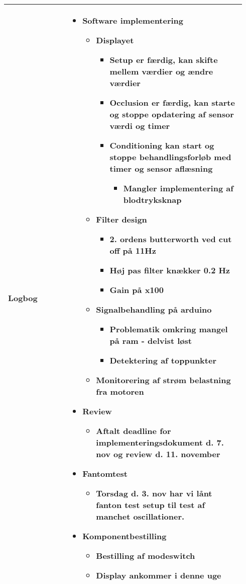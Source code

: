\begin{longtable}{|p{0.24\linewidth}|p{0.7\linewidth}|}
		\\ \hline
		Logbog & 
		\begin{itemize}
			\item Software implementering
			\begin{itemize}
				\item Displayet
				\begin{itemize}
					\item Setup er færdig, kan skifte mellem værdier og ændre værdier
					\item Occlusion er færdig, kan starte og stoppe opdatering af sensor værdi og timer
					\item Conditioning kan start og stoppe behandlingsforløb med timer og sensor aflæsning
					\begin{itemize}
						\item Mangler implementering af blodtryksknap
					\end{itemize}
				\end{itemize}
				\item Filter design
				\begin{itemize}
					\item 2. ordens butterworth ved cut off på 11Hz
					\item Høj pas filter knækker 0.2 Hz
					\item Gain på x100
				\end{itemize}
				\item Signalbehandling på arduino
				\begin{itemize}
					\item Problematik omkring mangel på ram - delvist løst
					\item Detektering af toppunkter 
				\end{itemize}
				\item Monitorering af strøm belastning fra motoren
			\end{itemize}
			\item Review
			\begin{itemize}
				\item Aftalt deadline for implementeringsdokument d. 7. nov og review d. 11. november
			\end{itemize}
			\item Fantomtest
			\begin{itemize}
				\item Torsdag d. 3. nov har vi lånt fanton test setup til test af manchet oscillationer.  
			\end{itemize}
			\item Komponentbestilling
			\begin{itemize}
				\item Bestilling af modeswitch 
				\item Display ankommer i denne uge
			\end{itemize}
		\end{itemize}
		\\ \hline
	\end{longtable}
	
